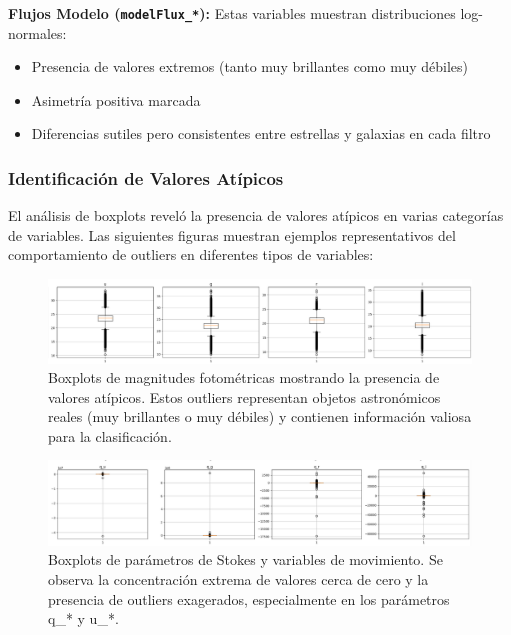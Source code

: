 \documentclass{article}
\begin{document}
\textbf{Flujos Modelo (\texttt{modelFlux\_*}):}
Estas variables muestran distribuciones log-normales:

\begin{itemize}
    \item Presencia de valores extremos (tanto muy brillantes como muy débiles)
    \item Asimetría positiva marcada
    \item Diferencias sutiles pero consistentes entre estrellas y galaxias en cada filtro
\end{itemize}

\subsubsection{Identificación de Valores Atípicos}

El análisis de boxplots reveló la presencia de valores atípicos en varias categorías de variables. Las siguientes figuras muestran ejemplos representativos del comportamiento de outliers en diferentes tipos de variables:

\begin{figure}[H]
    \centering
    \includegraphics[width=1.0\linewidth]{boxplot_1.png}
    \caption{Boxplots de magnitudes fotométricas mostrando la presencia de valores atípicos. Estos outliers representan objetos astronómicos reales (muy brillantes o muy débiles) y contienen información valiosa para la clasificación.}
    \label{fig:boxplot1}
\end{figure}

\begin{figure}[H]
    \centering
    \includegraphics[width=1.0\linewidth]{boxplot_2.png}
    \caption{Boxplots de parámetros de Stokes y variables de movimiento. Se observa la concentración extrema de valores cerca de cero y la presencia de outliers exagerados, especialmente en los parámetros q\_* y u\_*.}
    \label{fig:boxplot2}
\end{figure}
\end{document}
